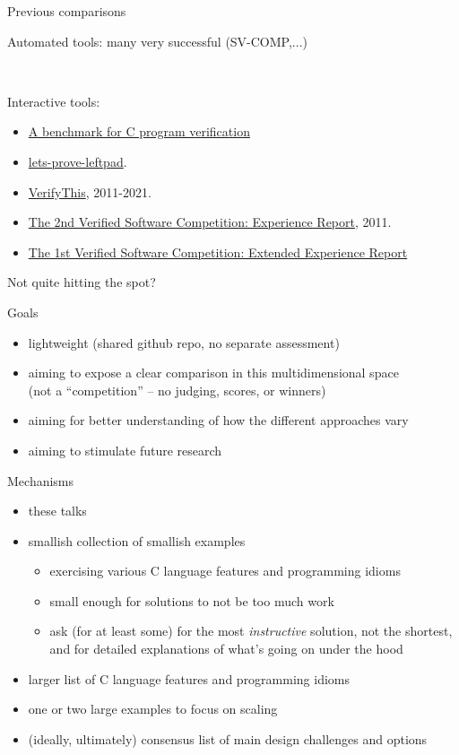 \documentclass[aspectratio=169]{beamer}
\newcommand{\myhref}[2]{\href{#2}{#1}}
\newenvironment{tightitemize}{
\begin{itemize}
  \setlength{\itemsep}{1pt}
  \setlength{\parskip}{0pt}
  \setlength{\parsep}{0pt}}{\end{itemize}
}
\begin{document}
\begin{frame}{Previous comparisons}

  Automated tools:  many very successful  (SV-COMP,...)

  \

  Interactive tools:
  \begin{tightitemize}
 
\item \myhref{A benchmark for C program verification}{https://www.cs.ru.nl/~freek/cbench/cbench.pdf}
\item \myhref{lets-prove-leftpad}{https://github.com/hwayne/lets-prove-leftpad}.
\item \myhref{VerifyThis}{https://www.pm.inf.ethz.ch/research/verifythis.html}, 2011-2021. 
\item \myhref{The 2nd Verified Software Competition: Experience Report}{https://hal.inria.fr/hal-00798777/document}, 2011. 
\item \myhref{The 1st Verified Software Competition: Extended Experience Report}{}
  \end{tightitemize}
  \pause
  Not quite hitting the spot?
\end{frame}

\begin{frame}{Goals}
  \begin{itemize}
  \item lightweight (shared github repo, no separate assessment)
  \item aiming to expose a clear comparison in this multidimensional space \\(not a ``competition'' -- no judging, scores, or winners)
  \item aiming for better understanding of how the different approaches vary
  \item aiming to stimulate future research
  \end{itemize}
\end{frame}


\begin{frame}{Mechanisms}
  \begin{itemize}
\item these talks
  \item smallish collection of smallish examples
    \begin{itemize}
    \item exercising various C language features and programming idioms
    \item small enough for solutions to not be too much work
    \item ask (for at least some) for the most \emph{instructive} solution, not the shortest, and for detailed explanations of what's going on under the hood
    \end{itemize}
  \item larger list of C language features and programming idioms
  \item one or two large examples to focus on scaling
  \item (ideally, ultimately) consensus list of main design challenges and options
  \end{itemize}
\end{frame}
    

  
  
\end{document}
